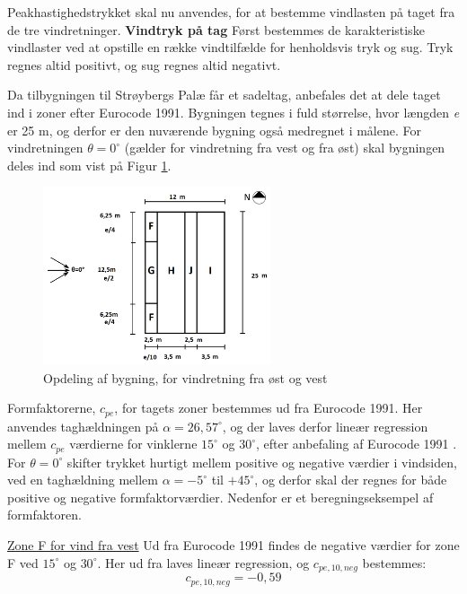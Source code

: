 Peakhastighedstrykket skal nu anvendes, for at bestemme vindlasten på taget fra de tre vindretninger.
\newline
\newline
\textbf{Vindtryk på tag}
\newline
Først bestemmes de karakteristiske vindlaster ved at opstille en række vindtilfælde for henholdsvis tryk og sug. Tryk regnes altid positivt, og sug regnes altid negativt.


Da tilbygningen til Strøybergs Palæ får et sadeltag, anbefales det at dele taget ind i zoner efter Eurocode 1991. Bygningen tegnes i fuld størrelse, hvor længden \textit{e} er 25 m, og derfor er den nuværende bygning også medregnet i målene. For vindretningen $\theta = 0^{\circ}$ (gælder for vindretning fra vest og fra øst) skal bygningen deles ind som vist på Figur \ref{fig:opdeling}.  

\begin{figure}[htbp]
	\centering
	\includegraphics[width=0.6\textwidth]{billeder/opdeling.png}
	\caption{Opdeling af bygning, for vindretning fra øst og vest \citep[ kapitel 7.2.5]{EU91}}
	\label{fig:opdeling}
\end{figure}

Formfaktorerne, $c_{pe}$, for tagets zoner bestemmes ud fra Eurocode 1991. Her anvendes taghældningen på $\alpha = 26,\!57^{\circ}$, og der laves derfor lineær regression mellem $c_{pe}$ værdierne for vinklerne $15^{\circ}$ og $30^{\circ}$, efter anbefaling af Eurocode 1991 \citep[ tabel 7.4a kapitel 7.2.5]{EU91}. For $\theta = 0^{\circ}$ skifter trykket hurtigt mellem positive og negative værdier i vindsiden, ved en taghældning mellem $\alpha = -5^{\circ}$ til $+ 45^{\circ}$, og derfor skal der regnes for både positive og negative formfaktorværdier. 
\newline \indent{     }  Nedenfor er et beregningseksempel af formfaktoren.


\underline{Zone F for vind fra vest}
\newline
Ud fra Eurocode 1991 \citep[ tabel 7.4a kapitel 7.2.5]{EU91} findes de negative værdier for zone F ved $15^{\circ}$ og $30^{\circ}$. Her ud fra laves lineær regression, og $c_{pe,10,neg}$ bestemmes:
\begin{equation}
	c_{pe,10,neg} = -0,\!59
\end{equation}

